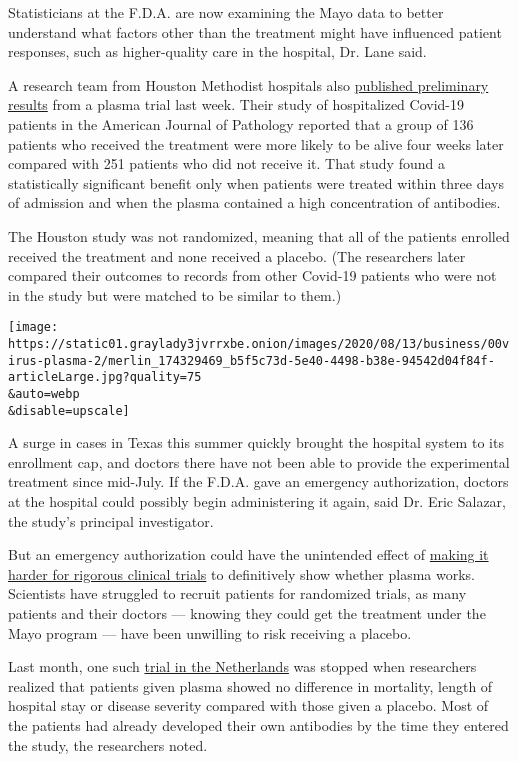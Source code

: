 Statisticians at the F.D.A. are now examining the Mayo data to better
understand what factors other than the treatment might have influenced
patient responses, such as higher-quality care in the hospital, Dr. Lane
said.

A research team from Houston Methodist hospitals also
\href{https://ajp.amjpathol.org/article/S0002-9440(20)30370-9/fulltext}{published
preliminary results} from a plasma trial last week. Their study of
hospitalized Covid-19 patients in the American Journal of Pathology
reported that a group of 136 patients who received the treatment were
more likely to be alive four weeks later compared with 251 patients who
did not receive it. That study found a statistically significant benefit
only when patients were treated within three days of admission and when
the plasma contained a high concentration of antibodies.

The Houston study was not randomized, meaning that all of the patients
enrolled received the treatment and none received a placebo. (The
researchers later compared their outcomes to records from other Covid-19
patients who were not in the study but were matched to be similar to
them.)

\texttt{[image: https://static01.graylady3jvrrxbe.onion/images/2020/08/13/business/00virus-plasma-2/merlin\_174329469\_b5f5c73d-5e40-4498-b38e-94542d04f84f-articleLarge.jpg?quality=75\\\&auto=webp\\\&disable=upscale]}

A surge in cases in Texas this summer quickly brought the hospital
system to its enrollment cap, and doctors there have not been able to
provide the experimental treatment since mid-July. If the F.D.A. gave an
emergency authorization, doctors at the hospital could possibly begin
administering it again, said Dr. Eric Salazar, the study's principal
investigator.

But an emergency authorization could have the unintended effect of
\href{https://www.nytimes3xbfgragh.onion/2020/08/04/health/trump-plasma.html}{making
it harder for rigorous clinical trials} to definitively show whether
plasma works. Scientists have struggled to recruit patients for
randomized trials, as many patients and their doctors --- knowing they
could get the treatment under the Mayo program --- have been unwilling
to risk receiving a placebo.

Last month, one such
\href{https://www.medrxiv.org/content/10.1101/2020.07.01.20139857v1}{trial
in the Netherlands} was stopped when researchers realized that patients
given plasma showed no difference in mortality, length of hospital stay
or disease severity compared with those given a placebo. Most of the
patients had already developed their own antibodies by the time they
entered the study, the researchers noted.

